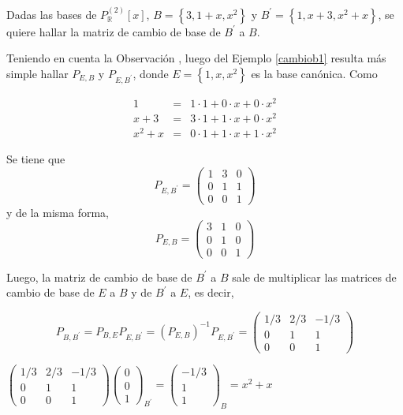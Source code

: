 \bigskip

\bigskip

\begin{example}
Dadas las bases de $P_\mathbb{R}^{(2)}\left[x\right]$, $B =\left\{3,1+x,x^{2}\right\}$  y $B^{\prime}= \left\{1,x+3,x^{2}+x\right\}$, se quiere hallar la matriz de cambio de base de $B ^{\prime}$ a $B$.

Teniendo en cuenta la Observación {\textcolor{blue}{\selectfont{i}}}, luego del Ejemplo \ref{cambiob1} resulta más simple hallar $P_{E,B}$ y  $P_{E,B ^{\prime}}$, donde $E =\left\{1,x,x^{2}\right\}$ es la base canónica.
 Como 


\begin{eqnarray*}
1&= & 1\cdot 1+0 \cdot x+ 0 \cdot x^2 \\
x+3&= &3\cdot1+ 1\cdot x +  0\cdot x^2 \\
x^2+x & = &0\cdot 1+ 1\cdot x + 1\cdot x^2
\end{eqnarray*}

Se tiene  que  
$$P_{E,B ^{\prime}}=\left(\begin{array}{ccc} 1 & 3 &  0 \\ 0 & 1 & 1
\\ 0 & 0 & 1
\end{array}
 \right)$$ 
 \bigskip
 \noindent
 y de la misma forma, 
$$P_{E,B}=\left(\begin{array}{ccc} 3 & 1 &  0 \\ 0 & 1 & 0
\\ 0 & 0 & 1
\end{array}
 \right)$$


\bigskip


Luego, la matriz de cambio de base de $B ^{\prime}$ a $B$ sale de multiplicar  las matrices de cambio de base de $E$ a $B$ y de $ B ^{\prime}$ a $E$, es decir,

$$P_{B,B ^{\prime}}=P_{B,E}P_{E,B ^{\prime}}=(P_{E,B})^{-1}P_{E,B ^{\prime}}= \left(\begin{array}{ccc} 1/3 & 2/3 &  -1/3 \\ 0 & 1 & 1
\\ 0 & 0 & 1
\end{array}
 \right)$$

\bigskip

$\left(\begin{array}{ccc} 1/3 & 2/3 &  -1/3 \\ 0 & 1 & 1
\\ 0 & 0 & 1
\end{array}
 \right)\left(\begin{array}{c} 0 \\ 0  
\\ 1 
\end{array} \right)_{B^{\prime}}=\left(\begin{array}{c} -1/3\\ 1  
\\ 1 
\end{array} \right)_B =x^{2}+x $

\end{example}
